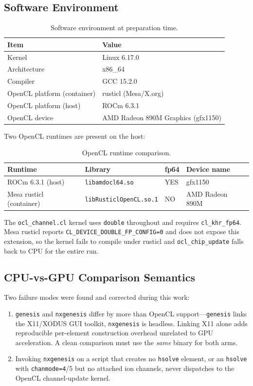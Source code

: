 \documentclass[11pt,a4paper]{article}
\begin{document}
\subsection{Software Environment}

\begin{table}[H]
\centering
\caption{Software environment at preparation time.}
\begin{tabular}{ll}
\toprule
Item & Value \\
\midrule
Kernel & Linux 6.17.0 \\
Architecture & x86\_64 \\
Compiler & GCC 15.2.0 \\
OpenCL platform (container) & rusticl (Mesa/X.org) \\
OpenCL platform (host) & ROCm 6.3.1 \\
OpenCL device & AMD Radeon 890M Graphics (gfx1150) \\
\bottomrule
\end{tabular}
\end{table}

Two OpenCL runtimes are present on the host:

\begin{table}[H]
\centering
\caption{OpenCL runtime comparison.}
\begin{tabular}{llll}
\toprule
Runtime & Library & fp64 & Device name \\
\midrule
ROCm 6.3.1 (host) & \texttt{libamdocl64.so} & YES & gfx1150 \\
Mesa rusticl (container) & \texttt{libRusticlOpenCL.so.1} & NO & AMD Radeon 890M \\
\bottomrule
\end{tabular}
\end{table}

The \texttt{ocl\_channel.cl} kernel uses \texttt{double} throughout and requires \texttt{cl\_khr\_fp64}. Mesa rusticl reports \texttt{CL\_DEVICE\_DOUBLE\_FP\_CONFIG=0} and does not expose this extension, so the kernel fails to compile under rusticl and \texttt{ocl\_chip\_update} falls back to CPU for the entire run.

\subsection{CPU-vs-GPU Comparison Semantics}

Two failure modes were found and corrected during this work:

\begin{enumerate}
  \item \texttt{genesis} and \texttt{nxgenesis} differ by more than OpenCL support---\texttt{genesis} links the X11/XODUS GUI toolkit, \texttt{nxgenesis} is headless. Linking X11 alone adds reproducible per-element construction overhead unrelated to GPU acceleration. A clean comparison must use the \emph{same} binary for both arms.
  \item Invoking \texttt{nxgenesis} on a script that creates no \texttt{hsolve} element, or an \texttt{hsolve} with \texttt{chanmode=4}/5 but no attached ion channels, never dispatches to the OpenCL channel-update kernel.
\end{enumerate}
\end{document}
